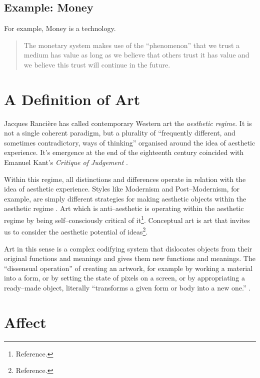 \documentclass[letter:wpaper]{article}
\begin{document}
    \subsection{Example: Money}

    For example, Money is a technology.

    \begin{quote}
        The monetary system makes use of the ``phenomenon'' that we trust a medium has value as long as we believe that others trust it has value and we believe this trust will continue in the future. \citep[p.55]{theNatureOfTechnology2009}
    \end{quote}

\section{A Definition of Art}

    Jacques Rancière has called contemporary Western art the \emph{aesthetic regime}. It is not a single coherent paradigm, but a plurality of ``frequently different, and sometimes contradictory, ways of thinking'' \citep[p.8]{RanciereMdrnTms2022} organised around the idea of aesthetic experience. It's emergence at the end of the eighteenth century coincided with Emanuel Kant's \emph{Critique of Judgement} \citep[pp.23–24]{RancierPltcsOfThAsthtcs2004}. 

    Within this regime, all distinctions and differences operate in relation with the idea of aesthetic experience. Styles like Modernism and Post–Modernism, for example, are simply different strategies for making aesthetic objects within the aesthetic regime \citep[p213]{ZepkeSblmArt2017}. Art which is anti–aesthetic is operating within the aesthetic regime by being self–consciously critical of it\footnote{
        Reference.
    }. Conceptual art is art that invites us to consider the aesthetic potential of ideas\footnote{
        Reference.
    }.

    Art in this sense is a complex codifying system that dislocates objects from their original functions and meanings and gives them new functions and meanings. The ``dissensual operation'' of creating an artwork, for example by working a material into a form, or by setting the state of pixels on a screen, or by appropriating a ready–made object, literally ``transforms a given form or body into a new one.'' \citep[p.54]{RancierThEmncptdSpcttr2009}.

\section{Affect}
\end{document}
